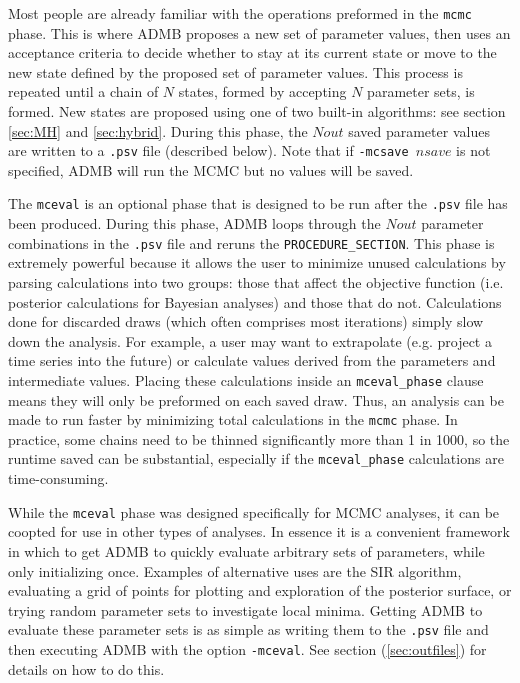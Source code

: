\documentclass{article}\usepackage[]{graphicx}\usepackage[]{color}
\begin{document}
Most people are already familiar with the operations preformed 
in the \texttt{mcmc} phase. This is where ADMB proposes a new 
set of parameter values, then uses an acceptance criteria to
decide whether to stay at its current state or move to the new
state defined by the proposed set of parameter values. This
process is repeated until a chain of $N$ states, formed by 
accepting $N$ parameter sets, is formed. New states are 
proposed using one of two built-in algorithms: see section \ref{sec:MH} 
and \ref{sec:hybrid}. During this phase, the $Nout$ saved
parameter values are written to a \texttt{.psv} file
(described below). Note that if \texttt{-mcsave $nsave$} is
not specified, ADMB will run the MCMC but no values will be
saved.

The \texttt{mceval} is an optional phase that is designed to
be run after the \texttt{.psv} file has been
produced. During this phase, ADMB loops through the $Nout$
parameter combinations in the \texttt{.psv} file and reruns
the \texttt{PROCEDURE\_SECTION}. This phase is extremely powerful 
because it allows the user to minimize unused calculations by 
parsing calculations into two groups: those that affect the
objective function (i.e. posterior calculations for Bayesian
analyses) and those that do not. Calculations done for
discarded draws (which often comprises most iterations) simply 
slow down the analysis. For example, a user may want to extrapolate
(e.g. project a time series into the future) or calculate
values derived from the parameters and intermediate
values. Placing these calculations inside an
\texttt{mceval\_phase} clause means they will only be preformed 
on each saved draw. Thus, an analysis can be made to run
faster by minimizing total calculations in the \texttt{mcmc}
phase. In practice, some chains need to be thinned significantly 
more than 1 in 1000, so the runtime saved can be substantial, 
especially if the \texttt{mceval\_phase} calculations are 
time-consuming.

While the \texttt{mceval} phase was designed specifically
for MCMC analyses, it can be coopted for use in other types
of analyses. In essence it is a convenient framework in
which to get ADMB to quickly evaluate arbitrary sets of
parameters, while only initializing once. Examples of
alternative uses are the SIR algorithm,
evaluating a grid of points for plotting and exploration of
the posterior surface, or trying random parameter sets to
investigate local minima. Getting ADMB to evaluate these
parameter sets is as simple as writing them to the
\texttt{.psv} file and then executing ADMB with the option
\texttt{-mceval}. See section (\ref{sec:outfiles}) for
details on how to do this.
\end{document}
